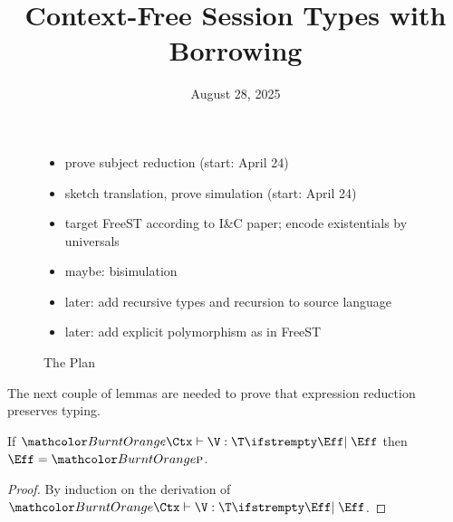 \documentclass[acmsmall,screen,review,anonymous,nonacm]{acmart}
\title{Context-Free Session Types with Borrowing}
\date{August 28, 2025}
\begin{document}
\maketitle

\begin{figure}[tp]
  \begin{itemize}
  \item prove subject reduction (start: April 24)
  \item sketch translation, prove simulation (start: April 24)
  \item target FreeST according to I\&C paper; encode existentials by
    universals
  \item maybe: bisimulation
  \item later: add recursive types and recursion to source language
  \item later: add explicit polymorphism as in FreeST
  \end{itemize}
  \caption{The Plan}
  \label{fig:the-plan}
\end{figure}


The next couple of lemmas are needed to prove that
expression reduction preserves typing.

\begin{lemma}
  If $\HasType[\Eff] {\Ctx} {\V} {\T}$
  then $\Eff = \EffPure$.
\end{lemma}
\begin{proof}
  By induction on the derivation of $\HasType[\Eff] {\Ctx} {\V} {\T}$.
\end{proof}
\end{document}
